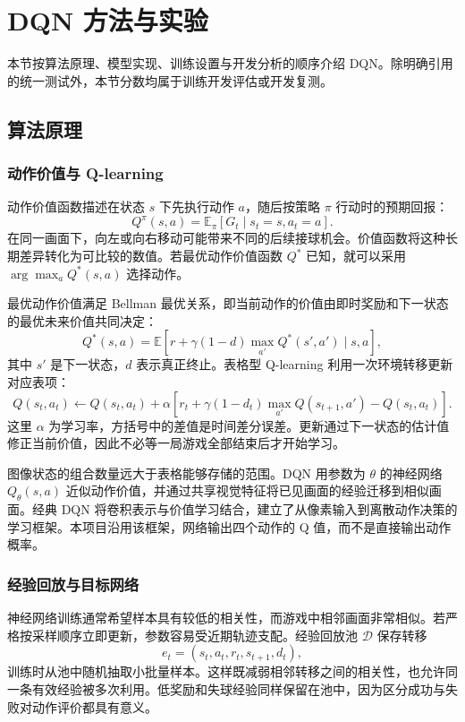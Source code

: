 \section{DQN 方法与实验}
\label{sec:dqn}
本节按算法原理、模型实现、训练设置与开发分析的顺序介绍 DQN。除明确引用的统一测试外，本节分数均属于训练开发评估或开发复测。

\subsection{算法原理}
\subsubsection{动作价值与 Q-learning}
动作价值函数描述在状态 $s$ 下先执行动作 $a$，随后按策略 $\pi$ 行动时的预期回报：
\begin{equation}
 Q^\pi(s,a)=\mathbb{E}_{\pi}[G_t\mid s_t=s,a_t=a].
\end{equation}
在同一画面下，向左或向右移动可能带来不同的后续接球机会。价值函数将这种长期差异转化为可比较的数值。若最优动作价值函数 $Q^*$ 已知，就可以采用 $\arg\max_a Q^*(s,a)$ 选择动作。

最优动作价值满足 Bellman 最优关系，即当前动作的价值由即时奖励和下一状态的最优未来价值共同决定：
\begin{equation}
 Q^*(s,a)=\mathbb{E}\!\left[
 r+\gamma(1-d)\max_{a'}Q^*(s',a')\mid s,a
 \right],
\end{equation}
其中 $s'$ 是下一状态，$d$ 表示真正终止。表格型 Q-learning 利用一次环境转移更新对应表项：
\begin{equation}
 Q(s_t,a_t)\leftarrow Q(s_t,a_t)+\alpha
 \left[r_t+\gamma(1-d_t)\max_{a'}Q(s_{t+1},a')-Q(s_t,a_t)\right].
\end{equation}
这里 $\alpha$ 为学习率，方括号中的差值是时间差分误差。更新通过下一状态的估计值修正当前价值，因此不必等一局游戏全部结束后才开始学习。

图像状态的组合数量远大于表格能够存储的范围。DQN 用参数为 $\theta$ 的神经网络 $Q_\theta(s,a)$ 近似动作价值，并通过共享视觉特征将已见画面的经验迁移到相似画面。经典 DQN 将卷积表示与价值学习结合，建立了从像素输入到离散动作决策的学习框架。本项目沿用该框架，网络输出四个动作的 Q 值，而不是直接输出动作概率。

\subsubsection{经验回放与目标网络}
神经网络训练通常希望样本具有较低的相关性，而游戏中相邻画面非常相似。若严格按采样顺序立即更新，参数容易受近期轨迹支配。经验回放池 $\mathcal D$ 保存转移
\begin{equation}
 e_t=(s_t,a_t,r_t,s_{t+1},d_t),
\end{equation}
训练时从池中随机抽取小批量样本。这样既减弱相邻转移之间的相关性，也允许同一条有效经验被多次利用。低奖励和失球经验同样保留在池中，因为区分成功与失败对动作评价都具有意义。

